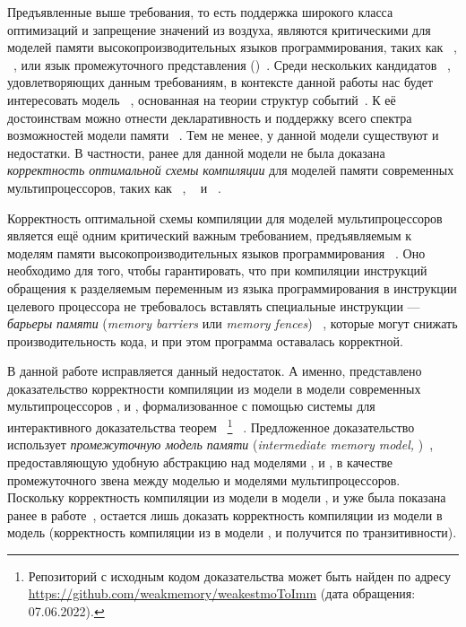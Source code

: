 Предъявленные выше требования, 
то есть поддержка широкого класса оптимизаций и 
запрещение значений из воздуха, являются 
критическими для моделей памяти высокопроизводительных 
языков программирования, таких как \CPP~\cite{Batty-al:POPL11}, 
\Java~\cite{Manson-al:POPL05}, или язык промежуточного представления \LLVM 
(\LLVMIR)~\cite{Chakraborty-Vafeiadis:CGO17}.
Среди нескольких кандидатов~%
\cite{Kang-al:POPL17,Paviotti-al:ESOP20,Jagadeesan-al:OOPSLA2020}, 
удовлетворяющих данным требованиям, в контексте данной работы нас будет 
интересовать модель \Wkm~\cite{Chakraborty-Vafeiadis:POPL19}, 
основанная на теории структур событий~\cite{Winskel:86}. 
К её достоинствам можно отнести декларативность и поддержку 
всего спектра возможностей модели памяти \CPP~\cite{Batty-al:POPL11}. 
Тем не менее, у данной модели существуют и недостатки. 
В частности, ранее для данной модели не была доказана 
\emph{корректность оптимальной схемы компиляции} для моделей памяти 
современных мультипроцессоров, таких как 
\Intel~\cite{Sewell-al:CACM10}, \ARM~\cite{Pulte-al:POPL18} 
и \POWER~\cite{Alglave-al:TOPLAS14}. 
 
Корректность оптимальной схемы компиляции для моделей мультипроцессоров 
является ещё одним критический важным требованием, 
предъявляемым к моделям памяти высокопроизводительных языков программирования%
~\cite{Moiseenko-al:PCS21}.
Оно необходимо для того, чтобы гарантировать, 
что при компиляции инструкций обращения к разделяемым переменным 
из языка программирования в инструкции целевого процессора
не требовалось вставлять специальные инструкции --- 
\emph{барьеры памяти} (\emph{memory barriers} или \emph{memory fences})%
~\cite{McKenney:2010}, которые могут снижать производительность кода,
и при этом программа оставалась корректной. 

В данной работе исправляется данный недостаток. 
А именно, представлено доказательство корректности компиляции
из модели \Wkm в модели современных мультипроцессоров \Intel, \ARM и \POWER, 
формализованное с помощью системы для интерактивного 
доказательства теорем~\coq%
\footnote{Репозиторий с исходным кодом доказательства может быть найден 
по адресу \url{https://github.com/weakmemory/weakestmoToImm} (дата обращения: 07.06.2022).}%
~\cite{Coq}.
Предложенное доказательство использует \emph{промежуточную модель памяти}
(\emph{intermediate memory model, \IMM})~\cite{Podkopaev-al:POPL19}, 
предоставляющую удобную абстракцию над моделями \Intel, \ARM и \POWER, 
в качестве промежуточного звена между моделью \Wkm и моделями мультипроцессоров.
Поскольку корректность компиляции из модели \IMM в модели \Intel, \ARM и \POWER
уже была показана ранее в работе~\cite{Podkopaev-al:POPL19},
остается лишь доказать корректность компиляции из модели \Wkm
в модель \IMM (корректность компиляции из \Wkm в модели \Intel, \ARM и \POWER
получится по транзитивности). 

